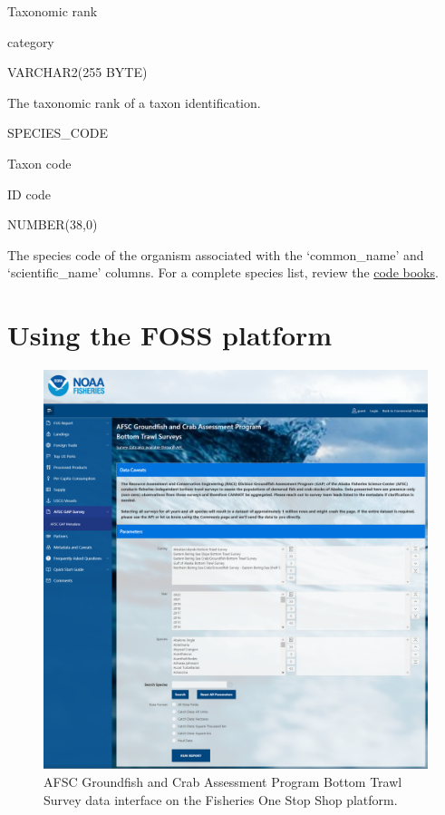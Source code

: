 \documentclass[
  letterpaper,
  oneside,
  open=any]{scrbook}
\begin{document}
Taxonomic rank

category

VARCHAR2(255 BYTE)

The taxonomic rank of a taxon identification.

SPECIES\_CODE

Taxon code

ID code

NUMBER(38,0)

The species code of the organism associated with the `common\_name' and
`scientific\_name' columns. For a complete species list, review the
\href{https://www.fisheries.noaa.gov/resource/document/groundfish-survey-species-code-manual-and-data-codes-manual}{code
books}.

\hypertarget{using-the-foss-platform}{%
\chapter{Using the FOSS platform}\label{using-the-foss-platform}}

\begin{figure}

{\centering \includegraphics[width=6.24in,height=\textheight]{content/../img/foss_1_interface.png}

}

\caption{AFSC Groundfish and Crab Assessment Program Bottom Trawl Survey
data interface on the Fisheries One Stop Shop platform.}

\end{figure}
\end{document}
